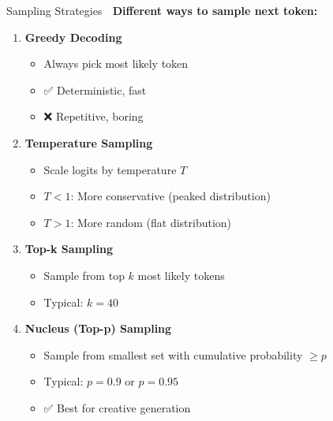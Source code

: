 \documentclass[aspectratio=169]{beamer}
\begin{document}
\begin{frame}[shrink=10]{Sampling Strategies 🎲}
    \textbf{Different ways to sample next token:}

    \vspace{0.3cm}

    \begin{enumerate}\setlength{\itemsep}{0pt}
        \item \textbf{Greedy Decoding}
        \begin{itemize}\setlength{\itemsep}{0pt}
            \item Always pick most likely token
            \item ✅ Deterministic, fast
            \item ❌ Repetitive, boring
        \end{itemize}

        \item \textbf{Temperature Sampling}
        \begin{itemize}\setlength{\itemsep}{0pt}
            \item Scale logits by temperature $T$
            \item $T < 1$: More conservative (peaked distribution)
            \item $T > 1$: More random (flat distribution)
        \end{itemize}

        \item \textbf{Top-k Sampling}
        \begin{itemize}\setlength{\itemsep}{0pt}
            \item Sample from top $k$ most likely tokens
            \item Typical: $k = 40$
        \end{itemize}

        \item \textbf{Nucleus (Top-p) Sampling}
        \begin{itemize}\setlength{\itemsep}{0pt}
            \item Sample from smallest set with cumulative probability $\geq p$
            \item Typical: $p = 0.9$ or $p = 0.95$
            \item ✅ Best for creative generation
        \end{itemize}
    \end{enumerate}
\end{frame}
\end{document}
